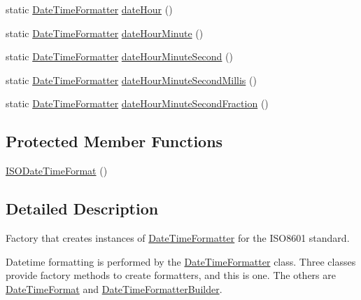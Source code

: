 \begin{DoxyCompactItemize}
\item 
static \hyperlink{classorg_1_1joda_1_1time_1_1format_1_1_date_time_formatter}{Date\-Time\-Formatter} \hyperlink{classorg_1_1joda_1_1time_1_1format_1_1_i_s_o_date_time_format_a35bf3f41dde21ec2132fb3fdef0e4cb9}{date\-Hour} ()
\item 
static \hyperlink{classorg_1_1joda_1_1time_1_1format_1_1_date_time_formatter}{Date\-Time\-Formatter} \hyperlink{classorg_1_1joda_1_1time_1_1format_1_1_i_s_o_date_time_format_a1d96e1703500b2f9e2f5266e4e323495}{date\-Hour\-Minute} ()
\item 
static \hyperlink{classorg_1_1joda_1_1time_1_1format_1_1_date_time_formatter}{Date\-Time\-Formatter} \hyperlink{classorg_1_1joda_1_1time_1_1format_1_1_i_s_o_date_time_format_a43d677e3844897c0490ac7d55e819bb8}{date\-Hour\-Minute\-Second} ()
\item 
static \hyperlink{classorg_1_1joda_1_1time_1_1format_1_1_date_time_formatter}{Date\-Time\-Formatter} \hyperlink{classorg_1_1joda_1_1time_1_1format_1_1_i_s_o_date_time_format_ab03e2f3328984f3bef09e6a475b4212c}{date\-Hour\-Minute\-Second\-Millis} ()
\item 
static \hyperlink{classorg_1_1joda_1_1time_1_1format_1_1_date_time_formatter}{Date\-Time\-Formatter} \hyperlink{classorg_1_1joda_1_1time_1_1format_1_1_i_s_o_date_time_format_a2b0cd1922951846e40ee4e89bc99594e}{date\-Hour\-Minute\-Second\-Fraction} ()
\end{DoxyCompactItemize}
\subsection*{Protected Member Functions}
\begin{DoxyCompactItemize}
\item 
\hyperlink{classorg_1_1joda_1_1time_1_1format_1_1_i_s_o_date_time_format_a4a2f56ea8c2b66b4f8860d9bf78e7050}{I\-S\-O\-Date\-Time\-Format} ()
\end{DoxyCompactItemize}


\subsection{Detailed Description}
Factory that creates instances of \hyperlink{classorg_1_1joda_1_1time_1_1format_1_1_date_time_formatter}{Date\-Time\-Formatter} for the I\-S\-O8601 standard. 

Datetime formatting is performed by the \hyperlink{classorg_1_1joda_1_1time_1_1format_1_1_date_time_formatter}{Date\-Time\-Formatter} class. Three classes provide factory methods to create formatters, and this is one. The others are \hyperlink{classorg_1_1joda_1_1time_1_1format_1_1_date_time_format}{Date\-Time\-Format} and \hyperlink{classorg_1_1joda_1_1time_1_1format_1_1_date_time_formatter_builder}{Date\-Time\-Formatter\-Builder}. 

